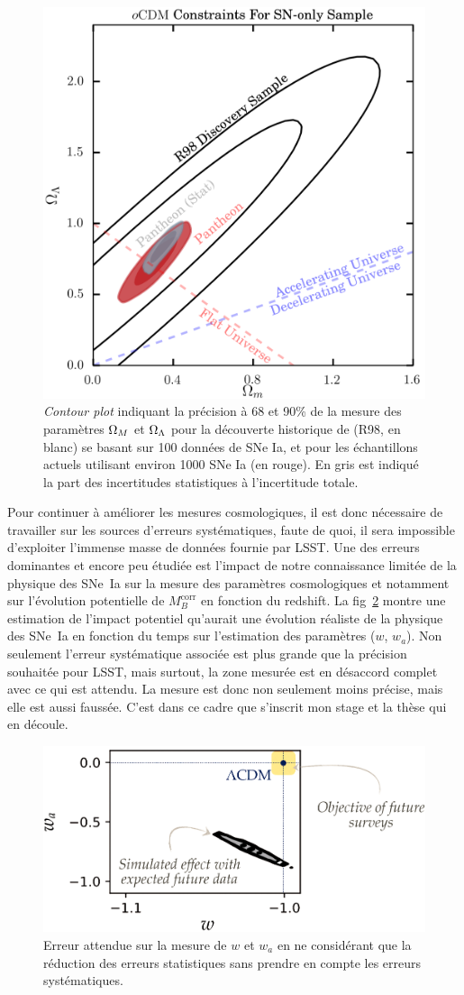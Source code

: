 \documentclass[a4paper, 12pt, svgnames]{article}
\begin{document}
\begin{figure}[htbp!]
    \centering
    \includegraphics[width=.5\linewidth]{Rapport_figures/scolnic_syst.png}
    \captionsetup{justification=centering}
    \caption{\textit{Contour plot} indiquant la précision à 68 et 90\% de la
    mesure des paramètres $\Omega_M$ et $\Omega_\Lambda$ pour la découverte historique de
     (R98, en blanc) se basant sur 100 données de SNe Ia, et
    pour les échantillons actuels utilisant environ 1000 SNe Ia (en rouge). En
    gris est indiqué la part des incertitudes statistiques à l'incertitude
    totale. \cite{scolnic_complete_2018}}
    \label{fig:scolnic_syst}
\end{figure}

Pour continuer à améliorer les mesures cosmologiques, il est donc nécessaire de
travailler sur les sources d'erreurs systématiques, faute de quoi, il sera
impossible d'exploiter l'immense masse de données fournie par LSST. Une des
erreurs dominantes et encore peu étudiée est l'impact de notre connaissance
limitée de la physique des SNe~Ia sur la mesure des paramètres cosmologiques
\cite{rigault_strong_2018} et notamment sur l'évolution potentielle de
$M_B^{\mathrm{corr}}$ en fonction du redshift. La fig~\ref{fig:err_syst} montre
une estimation de l'impact potentiel qu'aurait une évolution réaliste de la
physique des SNe~Ia en fonction du temps sur l'estimation des paramètres ($w$,
$w_a$).  Non seulement l'erreur systématique associée est plus grande que la
précision souhaitée pour LSST, mais surtout, la zone mesurée est en désaccord
complet avec ce qui est attendu. La mesure est donc non seulement moins précise,
mais elle est aussi faussée. C'est dans ce cadre que s'inscrit mon stage et la
thèse qui en découle.

\begin{figure}[htbp!]
    \centering
    \includegraphics[width=.5\linewidth]{Rapport_figures/error.PNG}
    \captionsetup{justification=centering}
    \caption{Erreur attendue sur la mesure de $w$ et $w_a$ en ne considérant
    que la réduction des erreurs statistiques sans prendre en compte les erreurs
    systématiques.}
    \label{fig:err_syst}
\end{figure}
\end{document}
